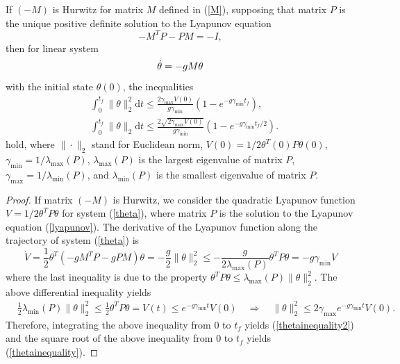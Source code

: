 \documentclass[10pt,doublecolumn]{IEEEtran}  %
\begin{document}
\begin{Lem}\label{norminequality}
If $(-M)$ is Hurwitz for matrix $M$ defined in (\ref{M}), supposing that matrix $P$ is the unique positive definite solution to the Lyapunov equation
\begin{equation}
-M^TP-PM=-I,\label{lyapunov}
\end{equation}
then for linear system
\begin{equation}
\dot{\theta}=-gM\theta\label{theta}\\
\end{equation}
with the initial state $\theta(0)$, the inequalities
\begin{subequations}\label{thetainequalitytotal}
\begin{align}
&\int^{t_f}_0\|\theta\|_2^2\mbox{d}t\leq \frac{2\gamma_{\max}V(0)}{g\gamma_{\min}} (1-e^{-g\gamma_{\min}t_f}),\label{thetainequality2}\\
&\int^{t_f}_0\|\theta\|_2\mbox{d}t\leq  \frac{2\sqrt{2\gamma_{\max}V(0)}}{g\gamma_{\min}} (1-e^{-g\gamma_{\min}t_f/2})\label{thetainequality}.
\end{align}
\end{subequations}
hold, where $\|\cdot\|_2$ stand for Euclidean norm, $V(0)=1/2\theta^T(0)P\theta(0)$, $\gamma_{\min}=1/\lambda_{\max}(P)$, $\lambda_{\max}(P)$ is the largest eigenvalue of matrix $P$, $\gamma_{\max}=1/\lambda_{\min}(P)$, and $\lambda_{\min}(P)$ is the smallest eigenvalue of matrix $P$.
\end{Lem}
\begin{proof}
If matrix $(-M)$ is Hurwitz, we consider the quadratic Lyapunov function $V=1/2\theta^TP\theta$ for system (\ref{theta}), where matrix $P$ is the solution to the Lyapunov equation (\ref{lyapunov}). The derivative of the Lyapunov function along the trajectory of system (\ref{theta}) is
\[\dot{V}=\frac{1}{2}\theta^T(-gM^TP-gPM)\theta= -\frac{g}{2}\|\theta\|^2_2\leq -\frac{g}{2\lambda_{\max}(P)}\theta^TP\theta= -g\gamma_{\min} V\]
where the last inequality is due to the property $\theta^TP\theta\leq \lambda_{\max}(P)\|\theta\|_2^2$. The above differential inequality yields
\begin{align*}
&\frac{1}{2}\lambda_{\min}(P)\|\theta\|_2^2\leq \frac{1}{2}\theta^TP\theta=V(t)\leq e^{ -g\gamma_{\min} t}V(0)\quad
\Longrightarrow\quad \|\theta\|^2_2\leq 2\gamma_{\max}e^{ -g\gamma_{\min} t}V(0).
\end{align*}
Therefore, integrating the above inequality from $0$ to $t_f$ yields (\ref{thetainequality2}) and the square root of the above inequality from $0$ to $t_f$ yields (\ref{thetainequality}).
\end{proof}
\end{document}

